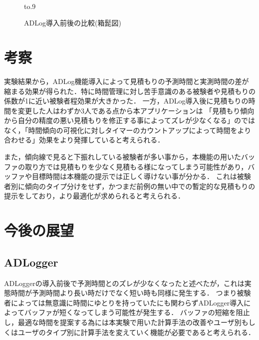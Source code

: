 \documentclass[submit,techrep,noauthor]{ipsj}
\begin{document}
\begin{figure}[tb]
\vbox{\large
\hbox{\
}}
\centerline{{\hbox to.9\textwidth{\hss\box0\hss}}}
\caption{ADLog導入前後の比較(箱髭図)}
\label{fig:10}
\end{figure}

\section{考察}
実験結果から，ADLog機能導入によって見積もりの予測時間と実測時間の差が縮まる効果が得られた．特に時間管理に対し苦手意識のある被験者や見積もりの係数が1に近い被験者程効果が大きかった．
一方，ADLog導入後に見積もりの時間を変更した人はわずか3人である点から本アプリケーションは
「見積もり傾向から自分の精度の悪い見積もりを修正する事によってズレが少なくなる」のではなく，「時間傾向の可視化に対しタイマーのカウントアップによって時間をより合わせる」効果をより発揮していると考えられる．

また，傾向線で見ると下振れしている被験者が多い事から，本機能の用いたバッファの取り方では見積もりを少なく見積もる様になってしまう可能性があり，バッファや目標時間は本機能の提示では正しく導けない事が分かる．
これは被験者別に傾向のタイプ分けをせず，かつまだ前例の無い中での暫定的な見積もりの提示をしており，より最適化が求められると考えられる．

\section{今後の展望}
\subsection{ADLogger}
ADLoggerの導入前後で予測時間とのズレが少なくなったと述べたが，これは実態時間が予測時間より長い時だけでなく短い時も同様に発生する．
つまり被験者によっては無意識に時間にゆとりを持っていたにも関わらずADLogger導入によってバッファが短くなってしまう可能性が発生する．
バッファの短縮を阻止し，最適な時間を提案する為には本実験で用いた計算手法の改善やユーザ別もしくはユーザのタイプ別に計算手法を変えていく機能が必要であると考えられる．
\end{document}
